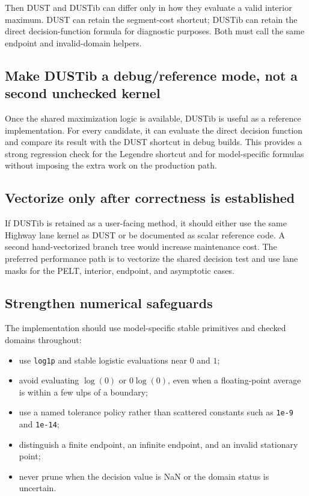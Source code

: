 \documentclass[11pt]{article}
\begin{document}
Then DUST and DUSTib can differ only in how they evaluate a valid interior
maximum.  DUST can retain the segment-cost shortcut; DUSTib can retain the
direct decision-function formula for diagnostic purposes.  Both must call
the same endpoint and invalid-domain helpers.

\subsection{Make DUSTib a debug/reference mode, not a second unchecked kernel}

Once the shared maximization logic is available, DUSTib is useful as a
reference implementation.  For every candidate, it can evaluate the direct
decision function and compare its result with the DUST shortcut in debug
builds.  This provides a strong regression check for the Legendre shortcut
and for model-specific formulas without imposing the extra work on the
production path.

\subsection{Vectorize only after correctness is established}

If DUSTib is retained as a user-facing method, it should either use the same
Highway lane kernel as DUST or be documented as scalar reference code.  A
second hand-vectorized branch tree would increase maintenance cost.  The
preferred performance path is to vectorize the shared decision test and use
lane masks for the PELT, interior, endpoint, and asymptotic cases.

\subsection{Strengthen numerical safeguards}

The implementation should use model-specific stable primitives and checked
domains throughout:

\begin{itemize}
  \item use \texttt{log1p} and stable logistic evaluations near $0$ and $1$;
  \item avoid evaluating $\log(0)$ or $0\log(0)$, even when a floating-point
        average is within a few ulps of a boundary;
  \item use a named tolerance policy rather than scattered constants such as
        \texttt{1e-9} and \texttt{1e-14};
  \item distinguish a finite endpoint, an infinite endpoint, and an invalid
        stationary point;
  \item never prune when the decision value is NaN or the domain status is
        uncertain.
\end{itemize}
\end{document}
